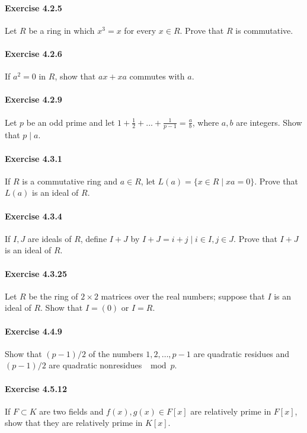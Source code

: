 \documentclass{article}
\begin{document}
\paragraph{Exercise 4.2.5} Let $R$ be a ring in which $x^3 = x$ for every $x \in R$. Prove that $R$ is commutative.

\paragraph{Exercise 4.2.6} If $a^2 = 0$ in $R$, show that $ax + xa$ commutes with $a$.

\paragraph{Exercise 4.2.9} Let $p$ be an odd prime and let $1 + \frac{1}{2} + ... + \frac{1}{p - 1} = \frac{a}{b}$, where $a, b$ are integers. Show that $p \mid a$.

\paragraph{Exercise 4.3.1} If $R$ is a commutative ring and $a \in R$, let $L(a) = \{x \in R \mid xa = 0\}$. Prove that $L(a)$ is an ideal of $R$.

\paragraph{Exercise 4.3.4} If $I, J$ are ideals of $R$, define $I + J$ by $I + J = {i + j \mid i \in I, j \in J}$. Prove that $I + J$ is an ideal of $R$.

\paragraph{Exercise 4.3.25} Let $R$ be the ring of $2 \times 2$ matrices over the real numbers; suppose that $I$ is an ideal of $R$. Show that $I = (0)$ or $I = R$.

\paragraph{Exercise 4.4.9} Show that $(p - 1)/2$ of the numbers $1, 2, \ldots, p - 1$ are quadratic residues and $(p - 1)/2$ are quadratic nonresidues $\mod p$.

\paragraph{Exercise 4.5.12} If $F \subset K$ are two fields and $f(x), g(x) \in F[x]$ are relatively prime in $F[x]$, show that they are relatively prime in $K[x]$.
\end{document}
